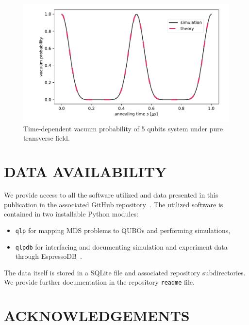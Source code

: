 \documentclass[10pt]{iopart}
\begin{document}
\begin{figure}
	\centering
	\includegraphics[width=\columnwidth]{./new_figures/vacuum_probability.pdf}
	\caption{Time-dependent vacuum probability of 5 qubits system under pure transverse field.}
	\label{figcheck}
\end{figure}


\section{DATA AVAILABILITY}
\label{sec:open-source}
We provide access to all the software utilized and data presented in this publication in the associated GitHub repository~\cite{github:cchang5/quantum_linear_programming}.
The utilized software is contained in two installable Python modules:
\begin{itemize}[leftmargin=*]
    \itemsep0em
    \item[] \texttt{qlp} for mapping MDS problems to QUBOs and performing simulations,
    \item[] \texttt{qlpdb} for interfacing and documenting simulation and experiment data through EspressoDB~\cite{Chang:2019khk}.
\end{itemize}
The data itself is stored in a SQLite file and associated repository subdirectories.
We provide further documentation in the repository \texttt{readme} file.


\section{ACKNOWLEDGEMENTS}
\end{document}
